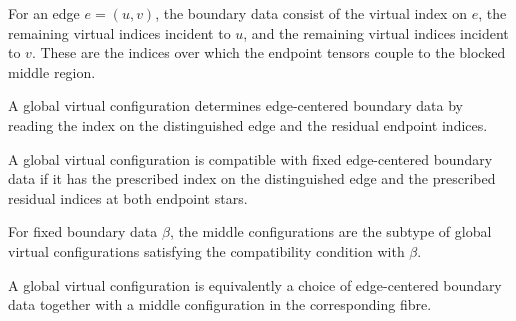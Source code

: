 \begin{definition}%
    \label{def:peps_edgeBoundaryConfig}
    \leanok
    For an edge $e=(u,v)$, the boundary data consist of the virtual index on
    $e$, the remaining virtual indices incident to $u$, and the remaining
    virtual indices incident to $v$. These are the indices over which the
    endpoint tensors couple to the blocked middle region.
\end{definition}

\begin{definition}%
    \label{def:peps_edgeBoundaryOfVirtualConfig}
    \leanok
    A global virtual configuration determines edge-centered boundary data by
    reading the index on the distinguished edge and the residual endpoint
    indices.
\end{definition}

\begin{definition}%
    \label{def:peps_edgeBoundaryMatches}
    \leanok
    A global virtual configuration is compatible with fixed edge-centered
    boundary data if it has the prescribed index on the distinguished edge and
    the prescribed residual indices at both endpoint stars.
\end{definition}

\begin{definition}%
    \label{def:peps_edgeMiddleConfig}
    \leanok
    For fixed boundary data $\beta$, the middle configurations are the subtype
    of global virtual configurations satisfying the compatibility condition with
    $\beta$.
\end{definition}

\begin{definition}%
    \label{def:peps_virtualConfigEquivEdgeBoundary}
    \leanok
    A global virtual configuration is equivalently a choice of edge-centered
    boundary data together with a middle configuration in the corresponding
    fibre.
\end{definition}

